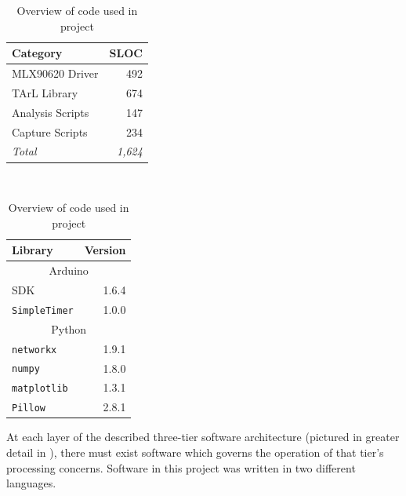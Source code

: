 \documentclass[../thesis/thesis.tex]{subfiles}
\begin{document}
\begin{table}
\centering
\begin{subtable}[b]{0.5\textwidth}
\centering
\begin{tabular}{|l|r|}
\hline
\textbf{Category} & \textbf{SLOC}  \\ \hline
MLX90620 Driver   & 492            \\ \hline
TArL Library      & 674            \\ \hline
Analysis Scripts  & 147            \\ \hline
Capture Scripts   & 234            \\ \hline
\textit{Total}    & \textit{1,624} \\ \hline
\end{tabular}
\caption{Source lines of code (SLOC) written}
\end{subtable}%
~%
\begin{subtable}[b]{0.5\textwidth}
\centering
\begin{tabular}{|l|r|}
\hline
\textbf{Library}     & \multicolumn{1}{l|}{\textbf{Version}} \\ \hline
\multicolumn{2}{|c|}{Arduino}                                \\ \hline
SDK                  & 1.6.4                                 \\ \hline
\texttt{SimpleTimer} & 1.0.0                                 \\ \hline
\multicolumn{2}{|c|}{Python}                                 \\ \hline
\texttt{networkx}    & 1.9.1                                 \\ \hline
\texttt{numpy}       & 1.8.0                                 \\ \hline
\texttt{matplotlib}  & 1.3.1                                 \\ \hline
\texttt{Pillow}      & 2.8.1                                 \\ \hline
\end{tabular}
\caption{Libraries used}
\end{subtable}
\caption{Overview of code used in project}
\end{table}

At each layer of the described three-tier software architecture (pictured in greater detail in ), there must exist software which governs the operation of that tier's processing concerns. Software in this project was written in two different languages.
\end{document}
